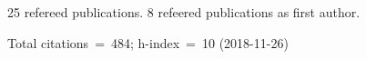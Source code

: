 25 refereed publications. 8 refeered publications as first author.

Total citations~=~484; h-index~=~10 (2018-11-26)